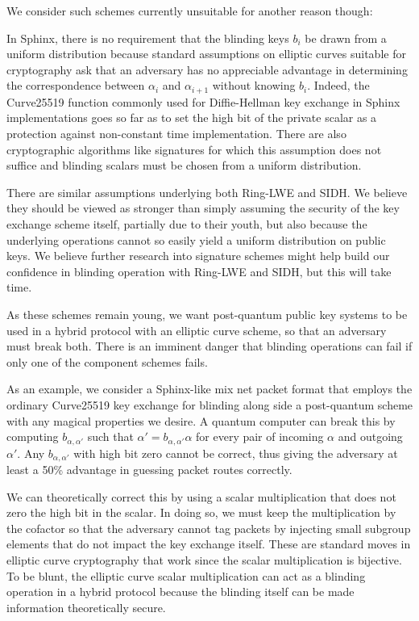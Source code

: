 \documentclass[twoside,letterpaper]{llncs}
\begin{document}
We consider such schemes currently unsuitable for another reason though: 

In Sphinx, there is no requirement that the blinding keys $b_i$ be
drawn from a uniform distribution because standard assumptions on
elliptic curves suitable for cryptography ask that an adversary has
no appreciable advantage in determining the correspondence between
$\alpha_i$ and $\alpha_{i+1}$ without knowing $b_i$.  
Indeed, the Curve25519 function commonly used for Diffie-Hellman key
exchange in Sphinx implementations goes so far as to set the high bit
of the private scalar as a protection against non-constant time
implementation.
There are also cryptographic algorithms like signatures for which
this assumption does not suffice and blinding scalars must be chosen
from a uniform distribution.

There are similar assumptions underlying both Ring-LWE and SIDH.
We believe they should be viewed as stronger than simply assuming the
security of the key exchange scheme itself, partially due to their
youth, but also because the underlying operations cannot so easily
yield a uniform distribution on public keys.  We believe further
research into signature schemes might help build our confidence in
blinding operation with Ring-LWE and SIDH, but this will take time.

As these schemes remain young, we want post-quantum public key
systems to be used in a hybrid protocol with an elliptic curve scheme,
so that an adversary must break both.  There is an imminent danger
that blinding operations can fail if only one of the component schemes
fails.

As an example, we consider a Sphinx-like mix net packet format that
employs the ordinary Curve25519 key exchange for blinding along side
a post-quantum scheme with any magical properties we desire.  
A quantum computer can break this by computing $b_{\alpha,\alpha'}$
such that $\alpha' = b_{\alpha,\alpha'} \alpha$ for every pair of
incoming $\alpha$ and outgoing $\alpha'$.  Any $b_{\alpha,\alpha'}$
with high bit zero cannot be correct, thus giving the adversary at
least a 50\% advantage in guessing packet routes correctly.

We can theoretically correct this by using a scalar multiplication that does not
zero the high bit in the scalar.  In doing so, we must keep the
multiplication by the cofactor so that the adversary cannot tag
packets by injecting small subgroup elements that do not impact the
key exchange itself.  These are standard moves in elliptic curve 
cryptography that work since the scalar multiplication is bijective.
To be blunt, the elliptic curve scalar multiplication can act as
a blinding operation in a hybrid protocol because the blinding itself
can be made information theoretically secure.
\end{document}
